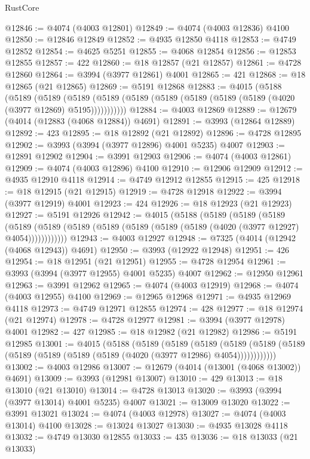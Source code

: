 \begin{lexlean}{RustCore}
\begin{coremodule}
@12846 := @4074 (@4003 @12801)
@12849 := @4074 (@4003 @12836) @4100
@12850 := @12846 @12849
@12852 := @4935 @12850 @4118
@12853 := @4749 @12852
@12854 := @4625 @5251
@12855 := @4068 @12854
@12856 := @12853 @12855
@12857 := 422
@12860 := @18 @12857 (@21 @12857)
@12861 := @4728 @12860
@12864 := @3994 (@3977 @12861) @4001
@12865 := 421
@12868 := @18 @12865 (@21 @12865)
@12869 := @5191 @12868
@12883 := @4015
    (@5188
      (@5189
        (@5189
          (@5189 (@5189 (@5189 (@5189 (@5189 (@5189 (@5189 (@4020 (@3977 @12869) @5195)))))))))))
@12884 := @4003 @12869
@12889 := @12679 (@4014 (@12883 (@4068 @12884)) @4691)
@12891 := @3993 (@12864 @12889)
@12892 := 423
@12895 := @18 @12892 (@21 @12892)
@12896 := @4728 @12895
@12902 := @3993 (@3994 (@3977 @12896) @4001 @5235) @4007
@12903 := @12891 @12902
@12904 := @3991 @12903
@12906 := @4074 (@4003 @12861)
@12909 := @4074 (@4003 @12896) @4100
@12910 := @12906 @12909
@12912 := @4935 @12910 @4118
@12914 := @4749 @12912 @12855
@12915 := 425
@12918 := @18 @12915 (@21 @12915)
@12919 := @4728 @12918
@12922 := @3994 (@3977 @12919) @4001
@12923 := 424
@12926 := @18 @12923 (@21 @12923)
@12927 := @5191 @12926
@12942 := @4015
    (@5188
      (@5189
        (@5189
          (@5189
            (@5189 (@5189 (@5189 (@5189 (@5189 (@5189 (@5189 (@4020 (@3977 @12927) @4054))))))))))))
@12943 := @4003 @12927
@12948 := @7325 (@4014 (@12942 (@4068 @12943)) @4691)
@12950 := @3993 (@12922 @12948)
@12951 := 426
@12954 := @18 @12951 (@21 @12951)
@12955 := @4728 @12954
@12961 := @3993 (@3994 (@3977 @12955) @4001 @5235) @4007
@12962 := @12950 @12961
@12963 := @3991 @12962
@12965 := @4074 (@4003 @12919)
@12968 := @4074 (@4003 @12955) @4100
@12969 := @12965 @12968
@12971 := @4935 @12969 @4118
@12973 := @4749 @12971 @12855
@12974 := 428
@12977 := @18 @12974 (@21 @12974)
@12978 := @4728 @12977
@12981 := @3994 (@3977 @12978) @4001
@12982 := 427
@12985 := @18 @12982 (@21 @12982)
@12986 := @5191 @12985
@13001 := @4015
    (@5188
      (@5189
        (@5189
          (@5189
            (@5189 (@5189 (@5189 (@5189 (@5189 (@5189 (@5189 (@4020 (@3977 @12986) @4054))))))))))))
@13002 := @4003 @12986
@13007 := @12679 (@4014 (@13001 (@4068 @13002)) @4691)
@13009 := @3993 (@12981 @13007)
@13010 := 429
@13013 := @18 @13010 (@21 @13010)
@13014 := @4728 @13013
@13020 := @3993 (@3994 (@3977 @13014) @4001 @5235) @4007
@13021 := @13009 @13020
@13022 := @3991 @13021
@13024 := @4074 (@4003 @12978)
@13027 := @4074 (@4003 @13014) @4100
@13028 := @13024 @13027
@13030 := @4935 @13028 @4118
@13032 := @4749 @13030 @12855
@13033 := 435
@13036 := @18 @13033 (@21 @13033)

\end{coremodule}
\end{lexlean}
